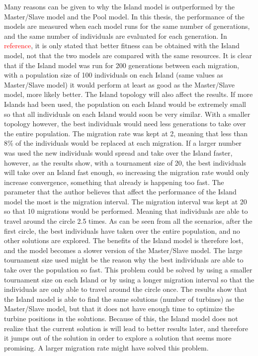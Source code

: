 \noindent Many reasons can be given to why the  Island model is outperformed by the Master/Slave model and the Pool model. In this thesis, the performance of the models are measured when each model runs for the same number of generations, and the same number of individuals are evaluated for each generation. In \textcolor{red}{reference}, it is only stated that better fitness can be obtained with the Island model, not that the two models are compared with the same resources. It is clear that if the Island model was run for 200 generations between each migration, with a population size of 100 individuals on each Island (same values as Master/Slave model) it would perform at least as good as the Master/Slave model, more likely better. The Island topology will also affect the results. If more Islands had been used, the population on each Island would be extremely small so that all individuals on each Island would soon be very similar. With a smaller topology however, the best individuals would need less generations to take over the entire population. The migration rate was kept at 2, meaning that less than 8\% of the individuals would be replaced at each migration. If a larger number was used the new individuals would spread and take over the Island faster, however, as the results show, with a tournament size of 20, the best individuals will take over an Island fast enough, so increasing the migration rate would only increase convergence, something that already is happening too fast. The parameter that the author believes that affect the performance of the Island model the most is the migration interval. The migration interval was kept at 20 so that 10 migrations would be performed. Meaning that individuals are able to travel around the circle 2.5 times. As can be seen from all the scenarios, after the first circle, the best individuals have taken over the entire population, and no other solutions are explored. The benefits of the Island model is therefore lost, and the model becomes a slower version of the Master/Slave model. The large tournament size used might be the reason why the best individuals are able to take over the population so fast. This problem could be solved by using a smaller tournament size on each Island or by using a longer migration interval so that the individuals are only able to travel around the circle once. The results show that the Island model is able to find the same solutions (number of turbines) as the Master/Slave model, but that it does not have enough time to optimize the turbine positions in the solutions. Because of this, the Island model does not realize that the current solution is will lead to better results later, and therefore it jumps out of the solution in order to explore a solution that seems more promising. A larger migration rate might have solved this problem.\\


